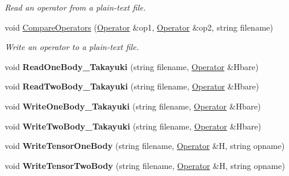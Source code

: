 \begin{DoxyCompactItemize}
\begin{DoxyCompactList}\small\item\em Read an operator from a plain-\/text file. \end{DoxyCompactList}\item 
\hypertarget{classReadWrite_a1275273dc4057c79a8e8c7d96b74f359}{void \hyperlink{classReadWrite_a1275273dc4057c79a8e8c7d96b74f359}{Compare\-Operators} (\hyperlink{classOperator}{Operator} \&op1, \hyperlink{classOperator}{Operator} \&op2, string filename)}\label{classReadWrite_a1275273dc4057c79a8e8c7d96b74f359}

\begin{DoxyCompactList}\small\item\em Write an operator to a plain-\/text file. \end{DoxyCompactList}\item 
\hypertarget{classReadWrite_a5486b782a5b2e137fea52e28e592c1fa}{void {\bfseries Read\-One\-Body\-\_\-\-Takayuki} (string filename, \hyperlink{classOperator}{Operator} \&Hbare)}\label{classReadWrite_a5486b782a5b2e137fea52e28e592c1fa}

\item 
\hypertarget{classReadWrite_a2c8e5f9f0f28a521501b3641390ecce4}{void {\bfseries Read\-Two\-Body\-\_\-\-Takayuki} (string filename, \hyperlink{classOperator}{Operator} \&Hbare)}\label{classReadWrite_a2c8e5f9f0f28a521501b3641390ecce4}

\item 
\hypertarget{classReadWrite_a085e8fbf3a73da1e127e7454392e0bca}{void {\bfseries Write\-One\-Body\-\_\-\-Takayuki} (string filename, \hyperlink{classOperator}{Operator} \&Hbare)}\label{classReadWrite_a085e8fbf3a73da1e127e7454392e0bca}

\item 
\hypertarget{classReadWrite_a7521de830de68614bb55147e4054c8df}{void {\bfseries Write\-Two\-Body\-\_\-\-Takayuki} (string filename, \hyperlink{classOperator}{Operator} \&Hbare)}\label{classReadWrite_a7521de830de68614bb55147e4054c8df}

\item 
\hypertarget{classReadWrite_a95ee464b3c576804bf9a75694f39bbe3}{void {\bfseries Write\-Tensor\-One\-Body} (string filename, \hyperlink{classOperator}{Operator} \&H, string opname)}\label{classReadWrite_a95ee464b3c576804bf9a75694f39bbe3}

\item 
\hypertarget{classReadWrite_a4d694656d136eb9f904b306e7cce9854}{void {\bfseries Write\-Tensor\-Two\-Body} (string filename, \hyperlink{classOperator}{Operator} \&H, string opname)}\label{classReadWrite_a4d694656d136eb9f904b306e7cce9854}


\end{DoxyCompactItemize}
